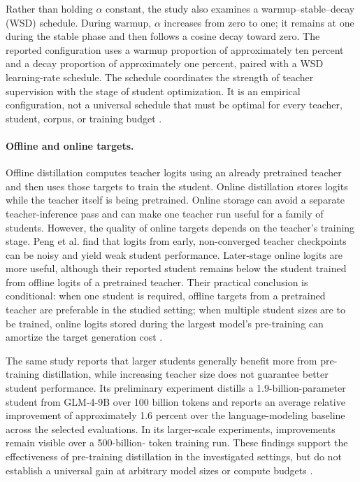 Rather than holding \(\alpha\) constant, the study also examines a
warmup--stable--decay (WSD) schedule.  During warmup, \(\alpha\) increases
from zero to one; it remains at one during the stable phase and then follows
a cosine decay toward zero.  The reported configuration uses a warmup
proportion of approximately ten percent and a decay proportion of
approximately one percent, paired with a WSD learning-rate schedule.  The
schedule coordinates the strength of teacher supervision with the stage of
student optimization.  It is an empirical configuration, not a universal
schedule that must be optimal for every teacher, student, corpus, or training
budget \parencite{Peng2024PretrainingDistillation}.

\paragraph{Offline and online targets.}
Offline distillation computes teacher logits using an already pretrained
teacher and then uses those targets to train the student.  Online distillation
stores logits while the teacher itself is being pretrained.  Online storage
can avoid a separate teacher-inference pass and can make one teacher run
useful for a family of students.  However, the quality of online targets
depends on the teacher's training stage.  Peng et al. find that logits from
early, non-converged teacher checkpoints can be noisy and yield weak student
performance.  Later-stage online logits are more useful, although their
reported student remains below the student trained from offline logits of a
pretrained teacher.  Their practical conclusion is conditional: when one
student is required, offline targets from a pretrained teacher are preferable
in the studied setting; when multiple student sizes are to be trained, online
logits stored during the largest model's pre-training can amortize the target
generation cost \parencite{Peng2024PretrainingDistillation}.

The same study reports that larger students generally benefit more from
pre-training distillation, while increasing teacher size does not guarantee
better student performance.  Its preliminary experiment distills a
1.9-billion-parameter student from GLM-4-9B over 100 billion tokens and
reports an average relative improvement of approximately 1.6 percent over
the language-modeling baseline across the selected evaluations.  In its
larger-scale experiments, improvements remain visible over a 500-billion-
token training run.  These findings support the effectiveness of pre-training
distillation in the investigated settings, but do not establish a universal
gain at arbitrary model sizes or compute budgets
\parencite{Peng2024PretrainingDistillation}.

